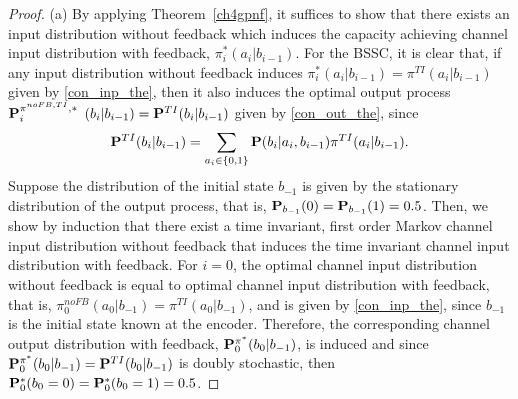 \documentclass[11pt, a4paper, journal,onecolumn]{IEEEtran}
\newcommand{\bea}{\begin{eqnarray}}
\newcommand{\eea}{\end{eqnarray}}
\begin{document}
\begin{proof} (a) By applying Theorem~\ref{ch4gpnf}, it suffices to show that there exists an input distribution without feedback which induces  the capacity achieving channel input distribution with feedback, $\pi^*_i(a_{i}|b_{i{-}1})$. For the BSSC, it is  clear that,  if any input distribution without feedback induces $\pi^*_i(a_{i}|b_{i{-}1})=\pi^{TI}(a_{i}|b_{i{-}1})$ given by \eqref{con_inp_the},
then it also induces the optimal output process ${\bf P}_i^{{\pi}^{noFB,TI},*}$ $(b_{i}|b_{i-1})={{\bf P}^{TI}(b_{i}|b_{i-1})}$ given by \eqref{con_out_the}, since
\bea
{\bf P}^{TI}(b_i|b_{i-1})=\sum_{a_{i} \in \{0,1\}}{\bf P}(b_i|a_i, b_{i-1}){\pi}^{TI}(a_i|b_{i-1}).
\eea
Suppose the distribution of the initial state $b_{-1}$ is given by the stationary distribution of the output process, that is, ${\bf P}_{b_{-1}}(0)={\bf P}_{b_{-1}}(1)=0.5$.  Then, we show by induction that there exist a time invariant, first order Markov channel input distribution without feedback that induces the time invariant channel input distribution with feedback. For $i=0$, the optimal channel input distribution without feedback is equal to optimal channel input distribution with feedback, that is, ${\pi}_0^{noFB}(a_0|b_{-1})={\pi}^{TI}(a_0|b_{-1})$, and is given by \eqref{con_inp_the}, since $b_{-1}$ is the initial state known at the encoder. Therefore, the  corresponding channel output distribution with feedback,  ${\bf P}_0^{{\pi}^*}(b_0|b_{-1})$, is induced and since ${\bf P}_0^{{\pi}^*}(b_0|b_{-1})={\bf P}^{TI}(b_0|b_{-1})$ is doubly stochastic, then ${\bf P}_0^*(b_0=0)={\bf P}_0^*(b_0=1)=0.5$. 


\end{proof}
\end{document}
